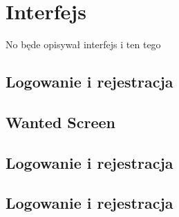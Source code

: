 \chapter{Interfejs}
\label{cha:interfejs}

No będe opisywał interfejs i ten tego

\section{Logowanie i rejestracja}


\section{Wanted Screen}


\section{Logowanie i rejestracja}


\section{Logowanie i rejestracja}



